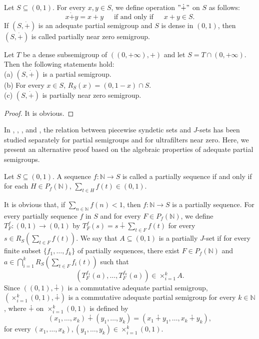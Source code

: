 \documentclass[twoside,11pt]{article}
\begin{document}
\begin{definition}{\label{2.6}}
	Let $S\subseteq (0,1)$. For every $x,y\in S$, we define operation $"\dot{+}"$ on $S$ as follows:
	\[
	x\dot{+}y=x+y\,\,\,\,\,\,\,\text{ if and only if }\,\,\,\,\,\,\,x+y\in S.
	\]
	If $(S,\dot{+})$ is an adequate partial semigroup and $S$ is dense in $(0,1)$, then $(S,\dot{+})$ is called partially near zero semigroup. 
\end{definition}
\begin{lemma}
	Let $T$ be a dense subsemigroup of $((0,+\infty),+)$ and let $S=T\cap (0,+\infty)$. Then the following statements hold:\\
	(a) $(S,\dot{+})$ is a partial semigroup.\\
	(b) For every $x\in S$, $R_S(x)=(0,1-x)\cap S$.\\
	(c) $(S,\dot{+})$ is partially near zero semigroup.
\end{lemma}
\begin{proof}
	It is obvious.
\end{proof}
In \cite{ba}, \cite{Hin-Lead}, \cite{Ghosh}, and \cite{Pa}, the relation between piecewise syndetic sets and \( J \)-sets has been studied separately for partial semigroups and for ultrafilters near zero. Here, we present an alternative proof based on the algebraic properties of adequate partial semigroups.
\begin{definition}
	Let $S\subseteq (0,1)$. A sequence $f:\mathbb{N}\to S$ is called a partially sequence if and only if for each $H\in P_f(\mathbb{N})$, $\sum_{t\in H}f(t) \in (0,1)$. 
\end{definition}

It is obvious that, if $\sum_{n\in\mathbb{N}}f(n)<1$, then $f:{\mathbb{N}}\to S$ is a partially sequence. For every partially sequence $f$ in $S$ and for every $F\in P_f(\mathbb{N})$, we define $T_F^f:(0,1)\to (0,1)$ by $T_F^f(s) = s \dotplus \sum_{t\in F}f(t)$ for every $s\in R_S(\sum_{t\in F}f(t))$. We say that $A\subseteq (0,1)$ is a partially $J$-set if for every finite subset $\{f_1,\dots,f_k\}$ of partially sequences, there exist $F\in P_f(\mathbb{N})$ and $a\in \bigcap_{i=1}^k R_S(\sum_{t\in F}f_i(t))$ such that 
\[
(T_F^{f_1}(a),\dots,T_F^{f_k}(a)) \in \times_{i=1}^k A. 
\] 
Since $((0,1),\dotplus)$ is a commutative adequate partial semigroup, $(\times_{i=1}^k(0,1),\dotplus)$ is a commutative adequate partial semigroup for every $k\in\mathbb{N}$, where $\dotplus$ on $\times_{i=1}^k(0,1)$ is defined by 
\[
(x_1,\dots,x_k) \dotplus (y_1,\dots,y_k) = (x_1 \dotplus y_1, \dots, x_k \dotplus y_k),
\]
for every $(x_1,\dots,x_k),(y_1,\dots,y_k)\in\times_{i=1}^k(0,1)$. 
\end{document}
